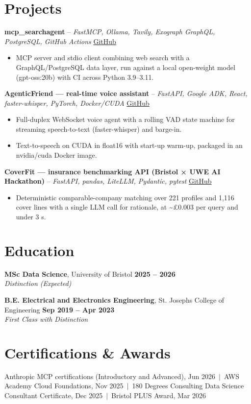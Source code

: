 \documentclass[a4paper,11pt]{article}
\begin{document}
\section{Projects}
\noindent\textbf{mcp\_searchagent} -- \textit{FastMCP, Ollama, Tavily, Exograph GraphQL, PostgreSQL, GitHub Actions} \hfill \href{https://github.com/Thiruvel-AP/mcp_searchagent}{GitHub}
\begin{itemize}
  \item MCP server and stdio client combining web search with a GraphQL/PostgreSQL data layer, run against a local open-weight model (gpt-oss:20b) with CI across Python 3.9–3.11.
\end{itemize}
\vspace{3pt}
\noindent\textbf{AgenticFriend — real-time voice assistant} -- \textit{FastAPI, Google ADK, React, faster-whisper, PyTorch, Docker/CUDA} \hfill \href{https://github.com/Thiruvel-AP/adk_multi-agent}{GitHub}
\begin{itemize}
  \item Full-duplex WebSocket voice agent with a rolling VAD state machine for streaming speech-to-text (faster-whisper) and barge-in.
  \item Text-to-speech on CUDA in float16 with start-up warm-up, packaged in an nvidia/cuda Docker image.
\end{itemize}
\vspace{3pt}
\noindent\textbf{CoverFit — insurance benchmarking API (Bristol × UWE AI Hackathon)} -- \textit{FastAPI, pandas, LiteLLM, Pydantic, pytest} \hfill \href{https://github.com/Thiruvel-AP/AIHackathon-Phoenix}{GitHub}
\begin{itemize}
  \item Deterministic comparable-company matching over 221 profiles and 1,116 cover lines with a single LLM call for rationale, at \textasciitilde{}£0.003 per query and under 3 s.
\end{itemize}

\section{Education}
\textbf{MSc Data Science}, University of Bristol \hfill \textbf{2025 – 2026}\\ \textit{Distinction (Expected)}\par
\vspace{3pt}
\textbf{B.E. Electrical and Electronics Engineering}, St. Joseph\textquotesingle{}s College of Engineering \hfill \textbf{Sep 2019 – Apr 2023}\\ \textit{First Class with Distinction}\par

\section{Certifications \& Awards}
Anthropic MCP certifications (Introductory and Advanced), Jun 2026 \,$|$\, AWS Academy Cloud Foundations, Nov 2025 \,$|$\, 180 Degrees Consulting Data Science Consultant Certificate, Dec 2025 \,$|$\, Bristol PLUS Award, Mar 2026
\end{document}
